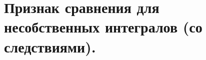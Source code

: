 \documentclass[../main.tex]{subfiles}
\begin{document}
\newpage
\section{Признак сравнения для несобственных интегралов (со следствиями).}
\end{document}
